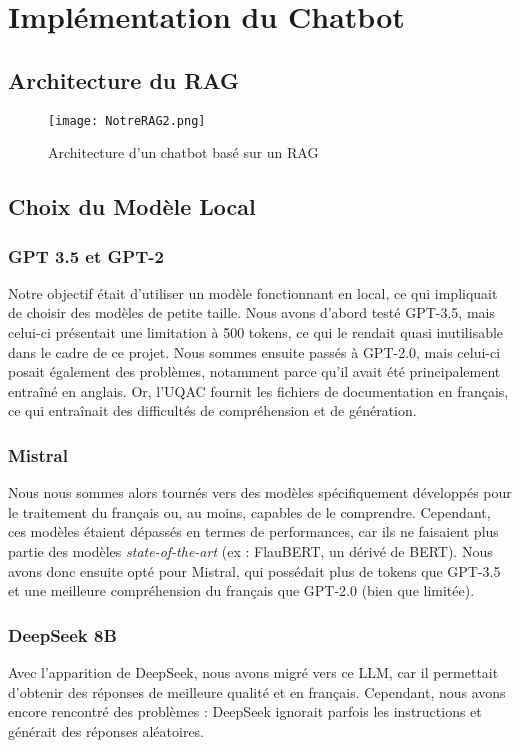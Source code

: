 \documentclass{article}
\begin{document}
\clearpage

\section{Implémentation du Chatbot}
\subsection{Architecture du RAG}
\begin{figure}[ht]
    \centering
    \texttt{[image: NotreRAG2.png]}
    \caption{Architecture d’un chatbot basé sur un RAG}
\end{figure}

\subsection{Choix du Modèle Local}
    \subsubsection{GPT 3.5 et GPT-2}
    \quad Notre objectif était d'utiliser un modèle fonctionnant en local, ce qui impliquait de choisir des modèles de petite taille. Nous avons d'abord testé GPT-3.5, mais celui-ci présentait une limitation à 500 tokens, ce qui le rendait quasi inutilisable dans le cadre de ce projet. Nous sommes ensuite passés à GPT-2.0, mais celui-ci posait également des problèmes, notamment parce qu'il avait été principalement entraîné en anglais. Or, l'UQAC fournit les fichiers de documentation en français, ce qui entraînait des difficultés de compréhension et de génération.
    
    \subsubsection{Mistral}
    Nous nous sommes alors tournés vers des modèles spécifiquement développés pour le traitement du français ou, au moins, capables de le comprendre. Cependant, ces modèles étaient dépassés en termes de performances, car ils ne faisaient plus partie des modèles \textit{state-of-the-art} (ex : FlauBERT, un dérivé de BERT). Nous avons donc ensuite opté pour Mistral, qui possédait plus de tokens que GPT-3.5 et une meilleure compréhension du français que GPT-2.0 (bien que limitée).
    
    \subsubsection{DeepSeek 8B}
    Avec l'apparition de DeepSeek, nous avons migré vers ce LLM, car il permettait d'obtenir des réponses de meilleure qualité et en français. Cependant, nous avons encore rencontré des problèmes : DeepSeek ignorait parfois les instructions et générait des réponses aléatoires.
    
\end{document}
